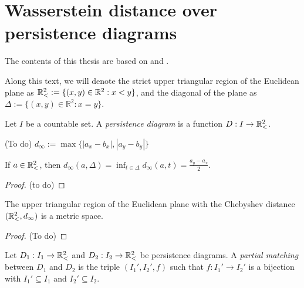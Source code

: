 \section{Wasserstein distance over persistence diagrams}

The contents of this thesis are based on \cite{Figalli} and \cite{Bubenik}.

Along this text, we will denote the strict upper triangular region of the Euclidean plane as $ \mathbb{R}_<^2 := \{(x, y) \in \mathbb R^2 : x < y\} $, and the diagonal of the plane as $ \Delta := \{(x, y) \in \mathbb R^2 : x = y\}$.

\begin{definition}
    Let $ I $ be a countable set. A {\it persistence diagram} is a function $ D: I \to \mathbb{R}_<^2 $.
\end{definition}

\begin{definition}(To do)
    $d_\infty := \max \{|a_x - b_x|, |a_y - b_y|\}$
\end{definition}

\begin{proposition}
    If $ a \in \mathbb{R}_<^2 $, then $ d_\infty(a, \Delta) = \inf_{t \in \Delta} d_\infty(a, t) = \frac{a_y - a_x}{2} $.
\end{proposition}
\begin{proof}
    (to do)  
\end{proof}

\begin{proposition}
    The upper triangular region of the Euclidean plane with the Chebyshev distance  $ (\mathbb{R}_<^2, d_\infty) $ is a metric space.
\end{proposition}
\begin{proof}
    (To do)
\end{proof}

\begin{definition}
    Let $ D_1: I_1 \to \mathbb{R}_<^2 $ and $ D_2: I_2 \to \mathbb{R}_<^2 $ be persistence diagrams. A {\it partial matching} between $ D_1 $ and $ D_2 $ is the triple $ (I_1', I_2', f) $ such that $ f: I_1' \to I_2' $ is a bijection with $ I_1' \subseteq I_1 $ and $ I_2' \subseteq I_2 $.
\end{definition}

